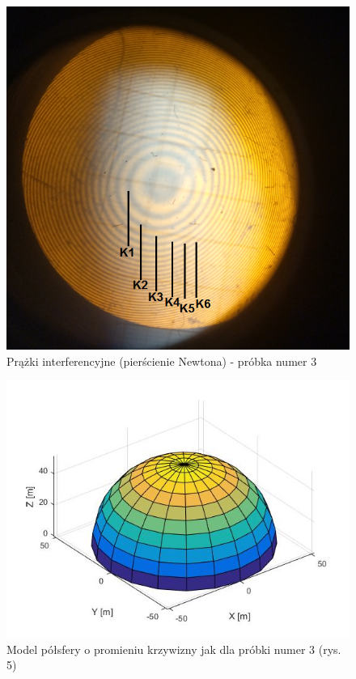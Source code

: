 \documentclass[12pt, a4paper, oneside]{article}
\begin{document}
\begin{figure}[t]
\centering
\caption{Prążki interferencyjne (pierścienie Newtona) - próbka numer 3}
\includegraphics[scale=.55]{pics/f4.png}
\end{figure}
\begin{figure}[b]
\centering
\caption{Model półsfery o promieniu krzywizny jak dla próbki numer 3 (rys. 5)}
\includegraphics[scale=.55]{pics/w2.jpg}
\end{figure}
\end{document}

